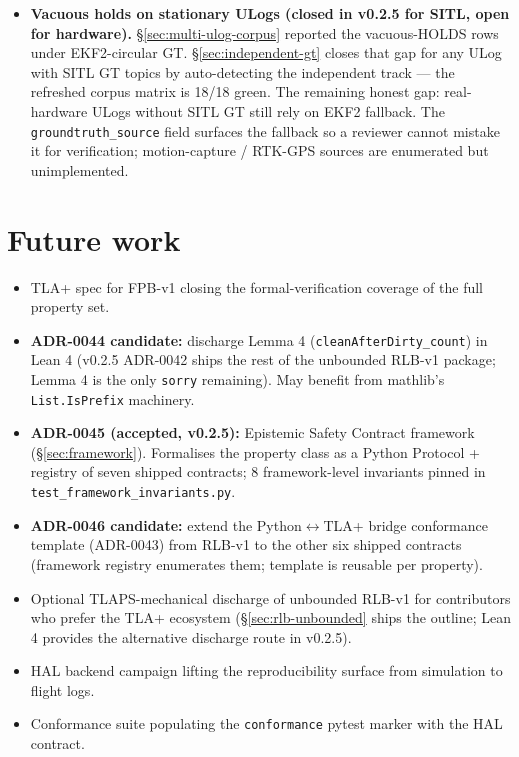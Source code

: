 \documentclass[11pt,a4paper]{article}
\begin{document}
\begin{itemize}
        (\S\ref{sec:properties}). The remaining honest gap:
        FPB-v2 does not validate the iid Bernoulli assumption
        Clopper-Pearson invokes, does not adjust for
        multiple-testing across parameter sweeps, and reports
        only a one-sided bound. Wilson-score and two-sided
        variants are deferred amendments.
  \item \textbf{Vacuous holds on stationary ULogs (closed in
        v0.2.5 for SITL, open for hardware).}
        \S\ref{sec:multi-ulog-corpus} reported the vacuous-HOLDS
        rows under EKF2-circular GT.
        \S\ref{sec:independent-gt} closes that gap for any ULog
        with SITL GT topics by auto-detecting the independent
        track --- the refreshed corpus matrix is 18/18 green.
        The remaining honest gap: real-hardware ULogs without
        SITL GT still rely on EKF2 fallback. The
        \texttt{groundtruth\_source} field surfaces the fallback
        so a reviewer cannot mistake it for verification;
        motion-capture / RTK-GPS sources are enumerated but
        unimplemented.
\end{itemize}

\section{Future work}

\begin{itemize}
  \item TLA+ spec for FPB-v1 closing the formal-verification
        coverage of the full property set.
  \item \textbf{ADR-0044 candidate:} discharge Lemma 4
        (\texttt{cleanAfterDirty\_count}) in Lean 4 (v0.2.5
        ADR-0042 ships the rest of the unbounded RLB-v1
        package; Lemma 4 is the only \texttt{sorry} remaining).
        May benefit from mathlib's \texttt{List.IsPrefix}
        machinery.
  \item \textbf{ADR-0045 (accepted, v0.2.5):} Epistemic Safety
        Contract framework (\S\ref{sec:framework}). Formalises
        the property class as a Python Protocol + registry of
        seven shipped contracts; 8 framework-level invariants
        pinned in \texttt{test\_framework\_invariants.py}.
  \item \textbf{ADR-0046 candidate:} extend the Python$\leftrightarrow$TLA+
        bridge conformance template (ADR-0043) from RLB-v1 to
        the other six shipped contracts (framework registry
        enumerates them; template is reusable per property).
  \item Optional TLAPS-mechanical discharge of unbounded RLB-v1
        for contributors who prefer the TLA+ ecosystem
        (\S\ref{sec:rlb-unbounded} ships the outline; Lean 4
        provides the alternative discharge route in v0.2.5).
  \item HAL backend campaign lifting the reproducibility surface
        from simulation to flight logs.
  \item Conformance suite populating the \texttt{conformance}
        pytest marker with the HAL contract.
\end{itemize}
\end{document}
